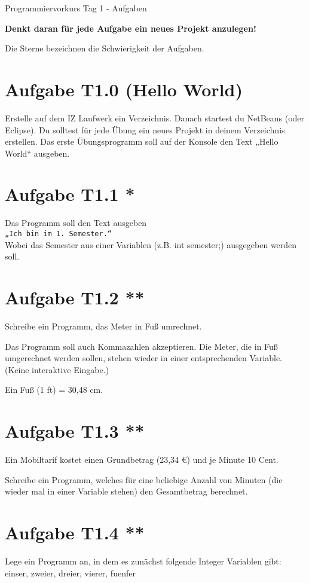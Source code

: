 \documentclass[final,a4paper]{article}
\begin{document}



{\huge Programmiervorkurs Tag 1 - Aufgaben}

\bigskip

\textbf{\color{red}Denkt daran für jede Aufgabe ein neues Projekt anzulegen!}

Die Sterne bezeichnen die Schwierigkeit der Aufgaben.

\section*{Aufgabe T1.0 (Hello World)}
Erstelle auf dem IZ Laufwerk ein Verzeichnis.
Danach startest du NetBeans (oder Eclipse).
Du solltest für jede Übung ein neues Projekt in deinem Verzeichnis erstellen.
Das erste Übungsprogramm soll auf der Konsole den Text „Hello World“ ausgeben.

\section*{Aufgabe T1.1 *}
Das Programm soll den Text ausgeben\\
\texttt{„Ich bin im 1. Semester.“}\\
Wobei das Semester aus einer Variablen (z.B. int semester;) ausgegeben werden soll.

\section*{Aufgabe T1.2 **}
Schreibe ein Programm, das Meter in Fuß umrechnet. 

Das Programm soll auch Kommazahlen akzeptieren. 
Die Meter, die in Fuß umgerechnet werden sollen, stehen wieder in einer entsprechenden Variable. 
(Keine interaktive Eingabe.)

Ein Fuß (1 ft) = 30,48 cm.

\section*{Aufgabe T1.3 **}
Ein Mobiltarif kostet einen Grundbetrag (23,34 \euro) und je Minute 10 Cent. 

Schreibe ein Programm, welches für eine beliebige Anzahl von Minuten (die wieder mal in einer Variable stehen) den Gesamtbetrag berechnet.

\section*{Aufgabe T1.4 **}
Lege ein Programm an, in dem es zunächst folgende Integer Variablen gibt: einser, zweier, dreier, vierer, fuenfer
\end{document}

